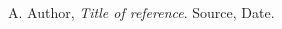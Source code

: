 \documentclass[../main.tex]{subfiles}
\begin{document}
\begin{thebibliography}{999}

  A. Author,
  \emph{Title of reference}.
  Source,
  Date.

\end{thebibliography}
\end{document}
